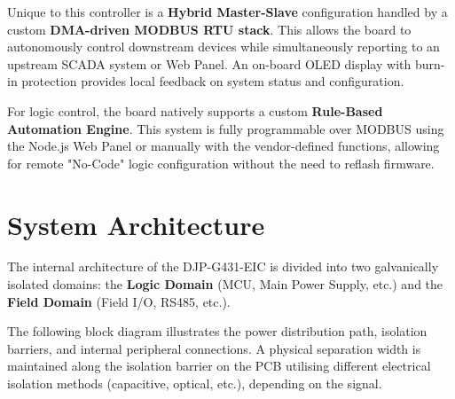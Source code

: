 \documentclass[10pt]{datasheet}
\begin{document}
Unique to this controller is a \textbf{Hybrid Master-Slave} configuration handled by a custom \textbf{DMA-driven MODBUS RTU stack}. This allows the board to autonomously control downstream devices while simultaneously reporting to an upstream SCADA system or Web Panel. An on-board OLED display with burn-in protection provides local feedback on system status and configuration.

For logic control, the board natively supports a custom \textbf{Rule-Based Automation Engine}. This system is fully programmable over MODBUS using the Node.js Web Panel or manually with the vendor-defined functions, allowing for remote "No-Code" logic configuration without the need to reflash firmware.



\vspace{1em}
\begin{center}
\end{center}


\onecolumn
\clearpage
\raggedbottom

\section{System Architecture}
The internal architecture of the DJP-G431-EIC is divided into two galvanically isolated domains: the \textbf{Logic Domain} (MCU, Main Power Supply, etc.) and the \textbf{Field Domain} (Field I/O, RS485, etc.). 

The following block diagram illustrates the power distribution path, isolation barriers, and internal peripheral connections. A physical separation width is maintained along the isolation barrier on the PCB utilising different electrical isolation methods (capacitive, optical, etc.), depending on the signal.
\end{document}
